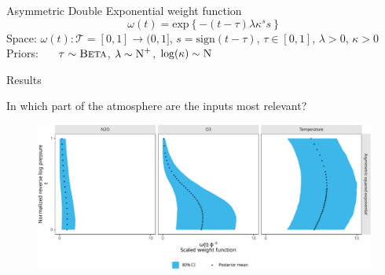 \documentclass[final]{beamer}
\begin{document}
\begin{frame}[t]
{\begin{minipage}[t][76cm][t]{58cm}
{\begin{minipage}[t][50cm][t]{58cm}
\begin{block}{Asymmetric Double Exponential weight function}
            \begin{equation}
              \omega(t)
              =
              \text{exp}\left\{-(t - \tau)\lambda\kappa^s s\right\}
            \end{equation}
            Space:
            $\omega(t): \mathcal{T} = [0, 1] \to (0, 1]$,
            $s = \text{sign}(t - \tau)$,
            $\tau\in[0,1]$,
            $\lambda > 0$,
            $\kappa > 0$ \\
            Priors:
            $\indent\tau \sim \textsc{Beta}$,
            $\lambda \sim \textsc{N}^{+}$,
            $\log(\kappa) \sim \textsc{N}$
          \end{block}
        \end{minipage}
      }
    \end{minipage}%
  }
  \colorbox{blue!20}{
    \begin{minipage}[t][76cm][t]{58cm}
      Results
      \begin{block}{In which part of the atmosphere are the inputs most relevant?}
        \begin{figure}
          \centering
          \includegraphics[width=\textwidth]{inc/mmls_weight_posterior_mini1}
          \label{fig:mmls-weight-posterior-mini1}
        \end{figure}
      \end{block}


\end{minipage}}
\end{frame}
\end{document}
